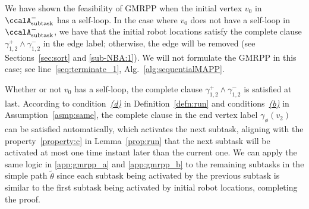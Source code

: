 \documentclass[Afour,sageh,times]{sagej}
\newcommand{\auto}[1]{\ccalA_{\textup{#1}}}
\newcounter{phase} \setcounter{phase}{0}
\newcounter{subphase}[phase] \setcounter{subphase}{0}
\begin{document}
{{\label{app:gmrpp_b}

We have shown the feasibility of GMRPP when the initial vertex $v_0$ in $\auto{subtask}^-$ has a self-loop. In the case where $v_0$ does not have a self-loop in $\auto{subtask}^-$, we have that the initial robot locations satisfy the complete clause  $\gamma_{1,2}^+ \wedge \gamma_{1,2}^-$ in the  edge label; otherwise, the edge will be  removed (see Sections~\ref{sec:sort} and \ref{sub-NBA:1}). We will not formulate the GMRPP in this case; see line~\ref{seq:terminate_1}, Alg.~\ref{alg:sequentialMAPP}.


Whether or not $v_0$ has a self-loop, the complete clause $\gamma_{1,2}^+ \wedge \gamma_{1,2}^-$ is satisfied at last. According to condition~\hyperref[cond:d]{\it (d)} in  Definition~\ref{defn:run} and conditions~\hyperref[asmp:b]{\it (b)} in Assumption~\ref{asmp:same}, the complete clause in the end vertex label $\gamma_\phi(v_2)$ can be satisfied automatically, which activates the next subtask, aligning with the property~\ref{property:c} in Lemma~\ref{prop:run} that  the next subtask will be activated at most one time instant later than the current one.  We can apply the same logic in \ref{app:gmrpp_a} and \ref{app:gmrpp_b} to the remaining subtasks in the simple path $\tilde{\theta}$ since each subtask being activated by the previous subtask is similar to the first subtask being activated by initial robot locations, completing the proof.

}}
\end{document}
